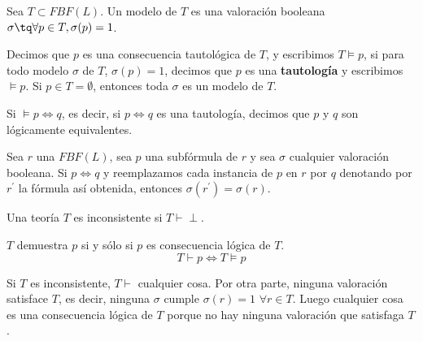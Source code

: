 \begin{defn}[Modelo]
	Sea $T\subset FBF(L)$. Un modelo de $T$ es una valoración booleana $\sigma \tq \forall p\in T, \sigma (p) = 1$.
\end{defn}

\begin{defn}
	Decimos que $p$ es una consecuencia tautológica de $T$, y escribimos $T\vDash p$, si para todo modelo $\sigma$ de $T$, $\sigma(p) = 1$, decimos que $p$ es una \textbf{tautología} y escribimos  $\vDash p$.
	Si $p\in T = \emptyset$, entonces toda $\sigma$ es un modelo de $T$.
\end{defn}

\begin{defn}
	Si $\vDash p \iff q$, es decir, si $p\iff q$ es una tautología, decimos que $p$ y $q$ son lógicamente equivalentes.
\end{defn}

\begin{obs}
	Sea $r$ una $FBF(L)$, sea $p$ una subfórmula de $r$ y sea $\sigma$ cualquier valoración booleana. Si $p\iff q$ y reemplazamos cada instancia de $p$ en $r$ por $q$ denotando por $r^\prime$ la fórmula así obtenida, entonces $\sigma(r^\prime) = \sigma(r)$.
\end{obs}

\begin{defn}
	Una teoría $T$ es inconsistente si $T\vdash \perp$.
\end{defn}

\begin{theorem}
	$T$ demuestra $p$ si y sólo si $p$ es consecuencia lógica de $T$.
	$$T\vdash p \iff T\vDash p$$
\end{theorem}

\begin{obs}
	Si $T$ es inconsistente, $T\vdash$ cualquier cosa.
	Por otra parte, ninguna valoración satisface $T$, es decir, ninguna $\sigma$ cumple $\sigma(r) = 1$ $\forall r\in T$. Luego cualquier cosa es una consecuencia lógica de $T$ porque no hay ninguna valoración que satisfaga $T$.
\end{obs}

